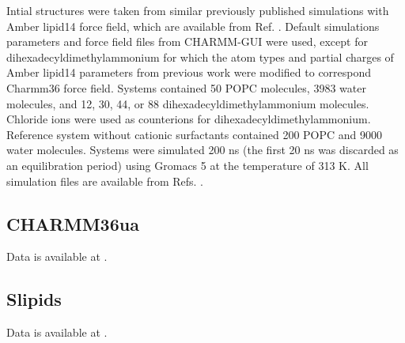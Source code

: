 \documentclass[journal=jpcbfk]{achemso}
\begin{document}
 

Intial structures were taken from similar previously published \cite{melcr18} simulations with Amber lipid14 force field,
which are available from Ref. .
Default simulations parameters and force field files from CHARMM-GUI \cite{lee16} were used, except for dihexadecyldimethylammonium
for which the atom types and partial charges of Amber lipid14 parameters from previous work \cite{melcr18} were modified to correspond Charmm36
force field. 
Systems contained 50 POPC molecules, 3983 water molecules, and 12, 30, 44, or 88 dihexadecyldimethylammonium molecules.
Chloride ions were used as counterions for dihexadecyldimethylammonium.
Reference system without cationic surfactants contained 200 POPC and 9000 water molecules.
Systems were simulated 200 ns (the first 20 ns was discarded as an equilibration period)
using Gromacs 5 \cite{abraham2015gromacs} at the temperature of 313 K.
All simulation files are available from Refs. .

\subsection{CHARMM36ua}

 Data is available at \cite{charmm36uaPOPEfiles}. 



\subsection{Slipids}
 Data is available at \cite{slipidsPOPEfiles}. 

\end{document}
